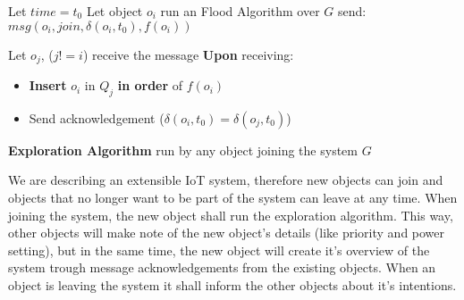 \documentclass[../main/Self-Stabilization.tex]{subfiles}
\begin{document}
\LinesNumbered
\IncMargin{1em}
\begin{algorithm}
Let $time = t_{0}$ \newline
Let object $o_{i}$ run an Flood Algorithm over $G$ \newline
send: $msg(o_{i}, join, \delta(o_{i}, t_{0}), f(o_{i}))$
\BlankLine

 {
    Let $o_{j}$, ($j!=i$) receive the message
    \BlankLine
    \textbf{Upon} receiving:\newline
     {
        \begin{itemize}
          \item \textbf{Insert} $o_{i}$ in $Q_{j}$ \textbf{in order} of $f(o_{i})$
          \item Send acknowledgement ($\delta(o_{i},t_{0}) = \delta(o_{j},t_{0})$)
        \end{itemize}
    }
}
\caption{\textbf{Exploration Algorithm} run by any object joining the system $G$} \label{algo2}
\end{algorithm}
\DecMargin{1em}

We are describing an extensible IoT system, therefore new objects can join and objects that no longer want to be part of the system can leave at any time. When joining the system, the new object shall run the exploration algorithm. This way, other objects will make note of the new object's details (like priority and power setting), but in the same time, the new object will create it's overview of the system trough message acknowledgements from the existing objects. When an object is leaving the system it shall inform the other objects about it's intentions.
\end{document}
